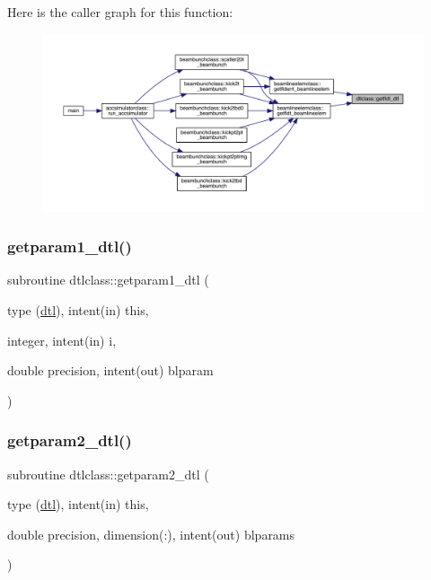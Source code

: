 Here is the caller graph for this function\+:\nopagebreak
\begin{figure}[H]
\begin{center}
\leavevmode
\includegraphics[width=350pt]{namespacedtlclass_aef6d69ea2a551751181175c270a8b745_icgraph}
\end{center}
\end{figure}
\mbox{\label{namespacedtlclass_abd0fd1a590b8e198a5b7081e105f11e8}} 
\subsubsection{\texorpdfstring{getparam1\_dtl()}{getparam1\_dtl()}}
{\footnotesize\ttfamily subroutine dtlclass\+::getparam1\+\_\+dtl (\begin{DoxyParamCaption}\item[{type (\mbox{\hyperlink{namespacedtlclass_structdtlclass_1_1dtl}{dtl}}), intent(in)}]{this,  }\item[{integer, intent(in)}]{i,  }\item[{double precision, intent(out)}]{blparam }\end{DoxyParamCaption})}

\mbox{\label{namespacedtlclass_aac10b9bb174a986cd15c1f0a11369c57}} 
\subsubsection{\texorpdfstring{getparam2\_dtl()}{getparam2\_dtl()}}
{\footnotesize\ttfamily subroutine dtlclass\+::getparam2\+\_\+dtl (\begin{DoxyParamCaption}\item[{type (\mbox{\hyperlink{namespacedtlclass_structdtlclass_1_1dtl}{dtl}}), intent(in)}]{this,  }\item[{double precision, dimension(\+:), intent(out)}]{blparams }\end{DoxyParamCaption})}

